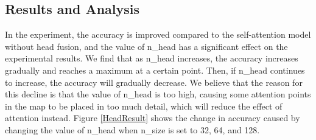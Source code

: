 \documentclass[10pt, conference, compsocconf]{IEEEtran}
\begin{document}
\subsection{Results and Analysis}
In the experiment, the accuracy is improved compared to the self-attention model without head fusion, and the value of n\_head has a significant effect on the experimental results. We find that as n\_head increases, the accuracy increases gradually and reaches a maximum at a certain point. Then, if n\_head continues to increase, the accuracy will gradually decrease. We believe that the reason for this decline is that the value of n\_head is too high, causing some attention points in the map to be placed in too much detail, which will reduce the effect of attention instead.
Figure \ref{HeadResult} shows the change in accuracy caused by changing the value of n\_head when n\_size is set to 32, 64, and 128.
\end{document}

